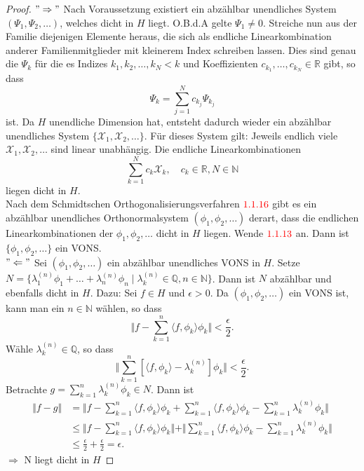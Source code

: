 \documentclass[12pt,titlepage]{article}
\numberwithin{equation}{section}
\begin{document}
\begin{proof}
$"\Rightarrow"$ Nach Voraussetzung existiert ein abzählbar unendliches System $(\Psi_1,\Psi_2,\ldots)$, welches dicht in $H$ liegt. O.B.d.A gelte $\Psi_1\neq 0.$ Streiche nun aus der Familie diejenigen Elemente heraus, die sich als endliche Linearkombination anderer Familienmitglieder mit kleinerem Index schreiben lassen. Dies sind genau die $\Psi_k$ für die es Indizes $k_1,k_2,\ldots,k_N< k$ und Koeffizienten $c_{k_1},\ldots,c_{k_N}\in \mathbb{R}$ gibt, so dass 
\[
\Psi_k=\sum_{j=1}^Nc_{k_j}\Psi_{k_j}
\] ist.
 Da $H$ unendliche Dimension hat, entsteht dadurch wieder ein abzählbar unendliches System $\{\mathcal{X}_1 ,\mathcal{X}_2 ,\ldots \}$. Für dieses System gilt: Jeweils endlich viele $\mathcal{X}_1 ,\mathcal{X}_2 ,\ldots $ sind linear unabhängig. Die endliche Linearkombinationen
\[
\sum_{k=1}^{N} c_k \mathcal{X}_k, \quad c_k \in \mathbb{R},N\in \mathbb{N}
\] liegen dicht in $H$.\\
Nach dem Schmidtschen Orthogonalisierungsverfahren $\textcolor{red}{1.1.16}$ gibt es ein abzählbar unendliches Orthonormalsystem $(\phi_1,\phi_2,\ldots)$ derart, dass die endlichen Linearkombinationen der $\phi_1,\phi_2,\ldots$ dicht in $H$ liegen. Wende $\textcolor{red}{1.1.13}$ an. Dann ist $\{\phi_1,\phi_2,\ldots\}$ ein VONS.\\
$"\Leftarrow"$ Sei $(\phi_1,\phi_2,\ldots)$ ein abzählbar unendliches VONS  in $H$. Setze $N=\{\lambda_1^{(n)}\phi_1+\ldots+\lambda_n^{(n)}\phi_n\mid \lambda_k^{(n)}\in \mathbb{Q},n\in \mathbb{N}\}$. Dann ist $N$ abzählbar und ebenfalls dicht in $H$. Dazu: Sei $f\in H$ und $\epsilon >0$. Da $(\phi_1,\phi_2,\ldots)$ ein VONS ist, kann man ein $n \in \mathbb{N}$ wählen, so dass 
\[
\Vert f- \sum_{k=1}^n \langle f, \phi_k\rangle \phi_k  \Vert<\frac{\epsilon}{2}.
\]
Wähle $\lambda_k^{(n)}\in \mathbb{Q}$, so dass 
\[
\Vert \sum_{k=1}^n [\langle f, \phi_k\rangle -  \lambda_k^{(n)}]\phi_k\Vert <\frac{\epsilon}{2}.
\]
Betrachte $g=\sum_{k=1}^n \lambda_k^{(n)}\phi_k \in N$. Dann ist 
\begin{align*}
\Vert f-g\Vert &=\Vert f-\sum_{k=1}^n \langle f, \phi_k\rangle \phi_k +\sum_{k=1}^n \langle f, \phi_k\rangle \phi_k-\sum_{k=1}^n \lambda_k^{(n)}\phi_k\Vert\\
&\leq \Vert f-\sum_{k=1}^n \langle f, \phi_k\rangle \phi_k\Vert +\Vert \sum_{k=1}^n \langle f, \phi_k\rangle \phi_k-\sum_{k=1}^n \lambda_k^{(n)}\phi_k\Vert\\
&\leq \frac{\epsilon}{2}+\frac{\epsilon}{2}=\epsilon. 
\end{align*}
$\Rightarrow$ N liegt dicht in $H$
\end{proof}
\end{document}
